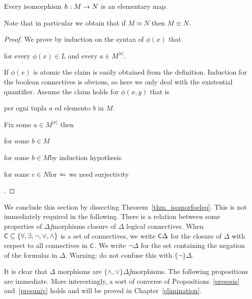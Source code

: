 \documentclass[creche.tex]{subfiles}
\begin{document}
\begin{theorem}\label{thm_isomorfoeleq}
Every isomorphism $h:M\rightarrow N$ is an elementary map.
\end{theorem}

Note that in particular we obtain that if $M\simeq N$ then $M\equiv N$.

\begin{proof}
We prove  by induction on the syntax of $\phi(x)$ that

\hfill for every $\phi(x)\in L$ and every $a\in M^{|x|}$.

If $\phi(x)$ is atomic the claim is easily obtained from the definition. Induction for the boolean connectives is obvious, so here we only deal with the existential quantifier. Assume the claim holds for $\phi(x,y)$ that is

 per ogni tupla $a$ ed elemento $b$ in $M$.

Fix some $a\in M^{|x|}$ then

 for some $b\in M$

 for some $b\in M$\hfill by induction hypothesis

 for some $c\in N$\hfill for $\Leftarrow$ we need surjectivity

.
\end{proof}




We conclude this section by dissecting Theorem~\ref{thm_isomorfoeleq}. This is not immediately required in the following. There is a relation between some properties of $\Delta\jj$morphisms closure of $\Delta$ logical connectives. When $\textsf{\small C}\subseteq\{\forall,\exists,\neg,\vee,\wedge\}$ is a set of connectives, we write \emph{$\textsf{\small C}\Delta$} for the closure of $\Delta$ with respect to all connectives in $\textsf{\small C}$. We write \emph{$\neg\Delta$} for the set containing the negation of the formulas in $\Delta$. Warning: do not confuse this with $\{\neg\}\Delta$.

It is clear that $\Delta$ morphisms are  $\{\wedge,\vee\}\Delta\jj$morphisms. The following propositions are immediate. More interestingly, a sort of converse of Propositions~\ref{presesis} and~\ref{presuniv} holds and will be proved in Chapter~\ref{elimination}.
\end{document}
